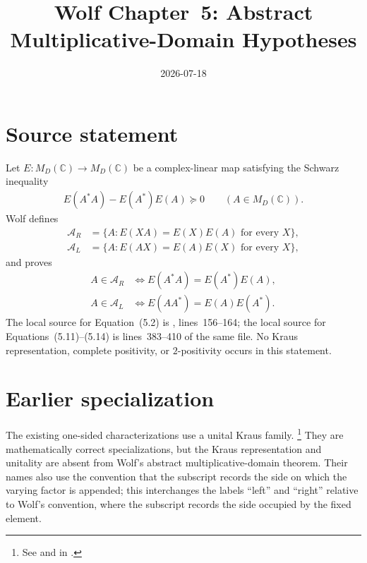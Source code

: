 \documentclass{article}
\title{Wolf Chapter~5: Abstract Multiplicative-Domain Hypotheses}
\author{}
\date{2026-07-18}
\begin{document}
\maketitle
{}

\section{Source statement}

Let $E:M_D(\mathbb C)\to M_D(\mathbb C)$ be a complex-linear map satisfying
the Schwarz inequality
\begin{align}
  E(A^*A)-E(A^*)E(A)\succeq 0
  \qquad (A\in M_D(\mathbb C)).
  \tag{Wolf, Equation (5.2)}
\end{align}
Wolf defines
\begin{align}
  \mathcal A_R
    &=\{A:E(XA)=E(X)E(A)\text{ for every }X\},\\
  \mathcal A_L
    &=\{A:E(AX)=E(A)E(X)\text{ for every }X\},
\end{align}
and proves
\begin{align}
  A\in\mathcal A_R
    &\iff E(A^*A)=E(A^*)E(A),\\
  A\in\mathcal A_L
    &\iff E(AA^*)=E(A)E(A^*).
  \tag{Wolf, Equations (5.13)--(5.14)}
\end{align}
The local source for Equation~(5.2) is
,
lines~156--164; the local source for Equations~(5.11)--(5.14) is
lines~383--410 of the same file.  No Kraus representation, complete
positivity, or $2$-positivity occurs in this statement.

\section{Earlier specialization}

The existing one-sided characterizations use a unital Kraus family.
\footnote{See
 and
 in
.}
They are mathematically correct specializations, but the
Kraus representation and unitality are absent from Wolf's abstract
multiplicative-domain theorem.  Their names also use the convention that the
subscript records the side on which the varying factor is appended; this
interchanges the labels ``left'' and ``right'' relative to Wolf's convention,
where the subscript records the side occupied by the fixed element.
\end{document}
